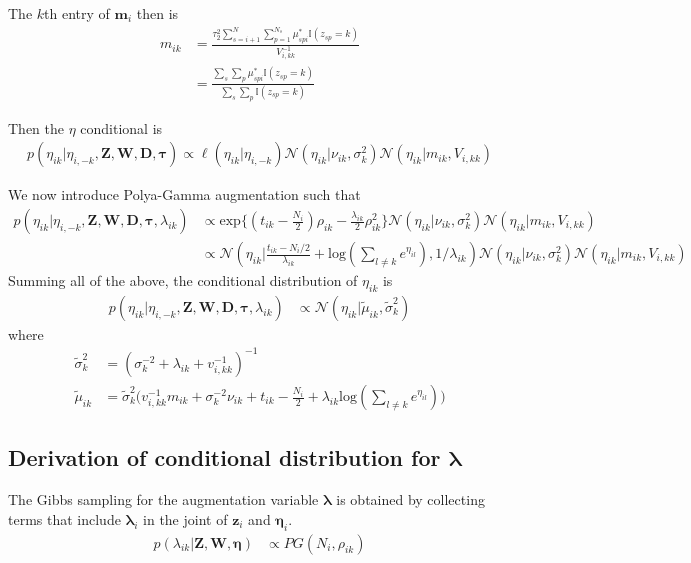 The $k$th entry of $\mathbf{m}_i$ then is
\begin{align}
    m_{ik} &= \frac{\tau_2^2\sum_{s=i+1}^N\sum_{p=1}^{N_s}\mu_{spi}^*\mathbb{I}(z_{sp}=k)}{V_{i,kk}^{-1}} \nonumber \\
    &= \frac{\sum_{s}\sum_{p}\mu_{spi}^*\mathbb{I}(z_{sp}=k)}{\sum_s\sum_{p}\mathbb{I}(z_{sp}=k)}
\end{align}

Then the $\eta$ conditional is
\begin{align}
    p(\eta_{ik}|\eta_{i,-k},\mathbf{Z},\mathbf{W},\mathbf{D},\pmb\tau) \propto \ell(\eta_{ik}|\eta_{i,-k})\mathcal{N}(\eta_{ik}|\nu_{ik},\sigma_k^2)\mathcal{N}(\eta_{ik}|m_{ik},V_{i,kk})
\end{align}

We now introduce Polya-Gamma augmentation such that 
{\footnotesize
\begin{align}
    p(\eta_{ik}|\eta_{i,-k},\mathbf{Z},\mathbf{W},\mathbf{D},\pmb\tau,\lambda_{ik}) &\propto \text{exp}\{(t_{ik}-\frac{N_i}{2})\rho_{ik} - \frac{\lambda_{ik}}{2}\rho_{ik}^2 \}\mathcal{N}(\eta_{ik}|\nu_{ik},\sigma_k^2)\mathcal{N}(\eta_{ik}|m_{ik},V_{i,kk}) \nonumber \\
    &\propto \mathcal{N}(\eta_{ik}|\frac{t_{ik}-N_i/2}{\lambda_{ik}}+\text{log}(\sum_{l\neq k}e^{\eta_{il}}),1/\lambda_{ik})\mathcal{N}(\eta_{ik}|\nu_{ik},\sigma_k^2)\mathcal{N}(\eta_{ik}|m_{ik},V_{i,kk})
\end{align}
}
\normalsize
Summing all of the above, the conditional distribution of $\eta_{ik}$ is 
\begin{align}
    p(\eta_{ik}|\eta_{i,-k},\mathbf{Z},\mathbf{W},\mathbf{D},\pmb\tau,\lambda_{ik}) &\propto \mathcal{N}(\eta_{ik}|\tilde{\mu}_{ik},\tilde{\sigma}_k^2)
\end{align}
where
\begin{align}
    \tilde{\sigma}_k^2 &= (\sigma_k^{-2} + \lambda_{ik} + v_{i,kk}^{-1})^{-1} \nonumber \\
    \tilde{\mu}_{ik} &= \tilde{\sigma}_k^2 \big( v_{i,kk}^{-1}m_{ik} + \sigma_k^{-2}\nu_{ik} + t_{ik} - \frac{N_i}{2} + \lambda_{ik}\text{log}(\sum_{l\neq k}e^{\eta_{il}}) \big)
\end{align}

\subsection*{Derivation of conditional distribution for $\pmb\lambda$}
The Gibbs sampling for the augmentation variable $\pmb\lambda$ is obtained by collecting terms that include $\pmb\lambda_i$ in the joint of $\pmb{z}_i$ and $\pmb\eta_i$.
\begin{align}
    p(\lambda_{ik}|\mathbf{Z},\mathbf{W},\pmb\eta) &\propto PG(N_i,\rho_{ik})
\end{align}

